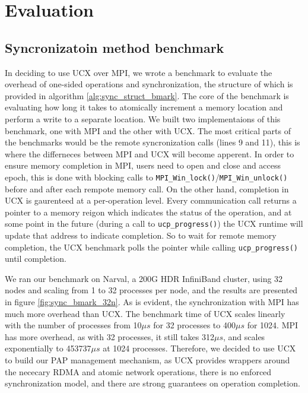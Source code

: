 \section{Evaluation}
\subsection{Syncronizatoin method benchmark}
In deciding to use UCX over MPI, we wrote a benchmark to evaluate the overhead of one-sided operations and synchronization, the structure of which is provided in algorithm \ref{alg:sync_struct_bmark}.
The core of the benchmark is evaluating how long it takes to atomically increment a memory location and perform a write to a separate location.
We built two implementaions of this benchmark, one with MPI and the other with UCX. 
The most critical parts of the benchmarks would be the remote syncronization calls (lines 9 and 11), this is where the differneces between MPI and UCX will become apperent.  
In order to ensure memory completion in MPI, users need to open and close and access epoch, this is done with blocking calls to \texttt{MPI\_Win\_lock()}/\texttt{MPI\_Win\_unlock()} before and after each rempote memory call.
On the other hand, completion in UCX is gaurenteed at a per-operation level. 
Every communication call returns a pointer to a memory reigon which indicates the status of the operation, and at some point in the future (during a call to \texttt{ucp\_progress()}) the UCX runtime will update that address to indicate completion.
So to wait for remote memory completion, the UCX benchmark polls the pointer while calling \texttt{ucp\_progress()} until completion.

We ran our benchmark on Narval, a 200G HDR InfiniBand cluster, using 32 nodes and scaling from 1 to 32 processes per node, and the results are presented in figure \ref{fig:sync_bmark_32n}.
As is evident, the synchronization with MPI has much more overhead than UCX.
The benchmark time of UCX scales linearly with the number of processes from 10$\mu s$ for 32 processes to 400$\mu s$ for 1024.
MPI has more overhead, as with 32 processes, it still takes 312$\mu s$, and scales exponentially to 453737$\mu s$ at 1024 processes.
Therefore, we decided to use UCX to build our PAP management mechanism, as UCX provides wrappers around the nececary RDMA and atomic network operations, there is no enforced synchronization model, and there are strong guarantees on operation completion. 




